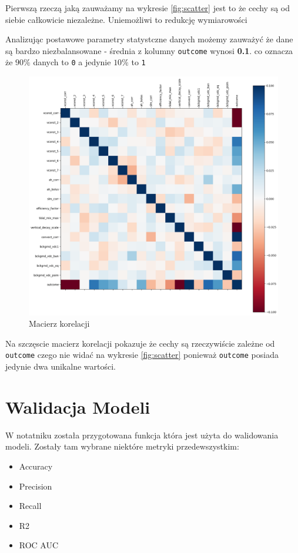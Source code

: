 \documentclass[12pt]{article}
\def\code#1{\texttt{#1}}
\begin{document}
        Pierwszą rzeczą jaką zauważamy na wykresie \ref{fig:scatter} jest to że cechy są od siebie całkowicie niezależne.
        Uniemożliwi to redukcję wymiarowości 
        
        Analizując postawowe parametry statystczne danych możemy zauważyć że dane są bardzo niezbalansowane - 
        średnia z kolumny \code{outcome} wynosi \textbf{0.1}. co oznacza że $90\%$ danych to \code{0} a jedynie $10\%$ to \code{1}
        
        \begin{figure}[h!]
            \centering
            \includegraphics[width=\textwidth]{resources/corr.png}
            \caption{Macierz korelacji}
            \label{fig:corr}
        \end{figure}

        Na szczęscie macierz korelacji pokazuje że cechy są rzeczywiście zależne od \code{outcome} czego nie widać na wykresie \ref{fig:scatter} 
        ponieważ \code{outcome} posiada jedynie dwa unikalne wartości.
        
        \newpage

        \section{Walidacja Modeli}
        W notatniku została przygotowana funkcja która jest użyta do walidowania modeli. Zostały tam wybrane niektóre metryki przedewszystkim:
        \begin{itemize}
            \item Accuracy
            \item Precision
            \item Recall
            \item R2
            \item ROC AUC
        \end{itemize}
\end{document}
